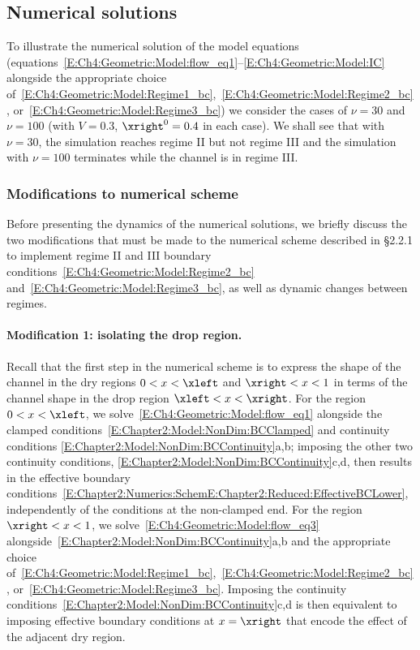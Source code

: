 \subsection{Numerical solutions}
To illustrate the numerical solution of the model equations (equations~\eqref{E:Ch4:Geometric:Model:flow_eq1}--\eqref{E:Ch4:Geometric:Model:IC} alongside the appropriate choice of~\eqref{E:Ch4:Geometric:Model:Regime1_bc},~\eqref{E:Ch4:Geometric:Model:Regime2_bc}, or~\eqref{E:Ch4:Geometric:Model:Regime3_bc}) we consider the cases of $\nu = 30$ and $\nu = 100$ (with $V = 0.3$, $\xright^0 = 0.4$ in each case). We shall see that with $\nu  = 30$, the simulation reaches regime II but not regime III and the simulation with $\nu = 100$ terminates while the channel is in regime III.

\subsubsection{Modifications to numerical scheme}\label{S:Geometry:Numerics}
Before presenting the dynamics of the numerical solutions, we briefly discuss the two modifications that must be made to the numerical scheme described in \S2.2.1 to implement regime II and III boundary conditions~\eqref{E:Ch4:Geometric:Model:Regime2_bc} and~\eqref{E:Ch4:Geometric:Model:Regime3_bc}, as well as dynamic changes between regimes.

\paragraph{Modification 1: isolating the drop region.}  Recall that the first step in the numerical scheme is to express the shape of the channel in the dry regions $0 < x <\xleft$ and $\xright < x < 1$ in terms of the channel shape in the drop region $\xleft < x < \xright$.  For the region $0 < x <\xleft$, we  solve~\eqref{E:Ch4:Geometric:Model:flow_eq1} alongside the clamped conditions~\eqref{E:Chapter2:Model:NonDim:BCClamped} and continuity conditions \eqref{E:Chapter2:Model:NonDim:BCContinuity}a,b;  imposing the other two continuity conditions, \eqref{E:Chapter2:Model:NonDim:BCContinuity}c,d, then results in the effective boundary conditions~\eqref{E:Chapter2:Numerics:SchemE:Chapter2:Reduced:EffectiveBCLower}, independently of the conditions at the non-clamped end. For the region $\xright < x < 1$, we solve~\eqref{E:Ch4:Geometric:Model:flow_eq3} alongside~\eqref{E:Chapter2:Model:NonDim:BCContinuity}a,b and the appropriate choice of~\eqref{E:Ch4:Geometric:Model:Regime1_bc},~\eqref{E:Ch4:Geometric:Model:Regime2_bc}, or~\eqref{E:Ch4:Geometric:Model:Regime3_bc}. Imposing the continuity conditions~\eqref{E:Chapter2:Model:NonDim:BCContinuity}c,d is then equivalent to imposing effective boundary conditions at $x = \xright$ that encode the effect of the adjacent dry region.


